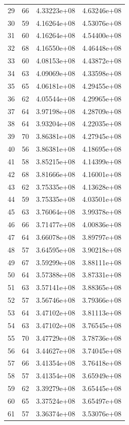 \documentclass[12pt,a4paper]{article}
\begin{document}
\begin{table}[htbp]
\begin{tabular}{ccc}
		29 & 66 & 4.33223e+08 & 4.63246e+08 \\
		30 & 59 & 4.16264e+08 & 4.53076e+08 \\
		31 & 60 & 4.16264e+08 & 4.54400e+08 \\
		32 & 68 & 4.16550e+08 & 4.46448e+08 \\
		33 & 60 & 4.08153e+08 & 4.43872e+08 \\
		34 & 63 & 4.09069e+08 & 4.33598e+08 \\
		35 & 65 & 4.06181e+08 & 4.29455e+08 \\
		36 & 62 & 4.05544e+08 & 4.29965e+08 \\
		37 & 64 & 3.97198e+08 & 4.28709e+08 \\
		38 & 64 & 3.93204e+08 & 4.22035e+08 \\
		39 & 70 & 3.86381e+08 & 4.27945e+08 \\
		40 & 56 & 3.86381e+08 & 4.18695e+08 \\
		41 & 58 & 3.85215e+08 & 4.14399e+08 \\
		42 & 68 & 3.81666e+08 & 4.16001e+08 \\
		43 & 62 & 3.75335e+08 & 4.13628e+08 \\
		44 & 59 & 3.75335e+08 & 4.03501e+08 \\
		45 & 63 & 3.76064e+08 & 3.99378e+08 \\
		46 & 66 & 3.71477e+08 & 4.00836e+08 \\
		47 & 64 & 3.66078e+08 & 3.89797e+08 \\
		48 & 57 & 3.64595e+08 & 3.90218e+08 \\
		49 & 67 & 3.59299e+08 & 3.88111e+08 \\
		50 & 64 & 3.57388e+08 & 3.87331e+08 \\
		51 & 63 & 3.57141e+08 & 3.88365e+08 \\
		52 & 57 & 3.56746e+08 & 3.79366e+08 \\
		53 & 64 & 3.47102e+08 & 3.81113e+08 \\
		54 & 63 & 3.47102e+08 & 3.76545e+08 \\
		55 & 70 & 3.47729e+08 & 3.78736e+08 \\
		56 & 64 & 3.44627e+08 & 3.74045e+08 \\
		57 & 66 & 3.41354e+08 & 3.76418e+08 \\
		58 & 57 & 3.41354e+08 & 3.65949e+08 \\
		59 & 62 & 3.39279e+08 & 3.65445e+08 \\
		60 & 65 & 3.37524e+08 & 3.65497e+08 \\
		61 & 57 & 3.36374e+08 & 3.53076e+08 \\

\end{tabular}
\end{table}
\end{document}
